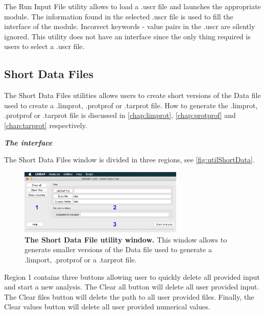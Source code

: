 The Run Input File utility allows to load a .uscr file and launches the appropriate module. The information found in the selected .uscr file is used to fill the interface of the module. Incorrect keywords - value pairs in the .uscr are silently ignored. This utility does not have an interface since the only thing required is users to select a .uscr file.

\subsection{Short Data Files}
\label{subsec:utilShortDF}

The Short Data Files utilities allows users to create short versions of the Data file used to create a .limprot, .protprof or .tarprot file. How to generate the .limprot, .protprof or .tarprot file is discussed in \autoref{chap:limprot}, \autoref{chap:protprof} and \autoref{chap:tarprot} respectively.

\textit{\textbf{The interface}}

The Short Data Files window is divided in three regions, see \autoref{fig:utilShortData}.

\begin{figure}[h]
	\centering
	\includegraphics[width=0.7\textwidth]{./IMAGES/UTIL-SHORTDF-WINDOW/util-shortdf.jpg}	    
	\caption[The Short Data File utility window]{\textbf{The Short Data File utility window.} This window allows to generate smaller versions of the Data file used to generate a .limport, .protprof or a .tarprot file.} 
	\label{fig:utilShortData}
	\vspace{-5pt} 	
\end{figure} 

Region \num{1} contains three buttons allowing user to quickly delete all provided input and start a new analysis. The Clear all button will delete all user provided input. The Clear files button will delete the path to all user provided files. Finally, the Clear values button will delete all user provided numerical values.

